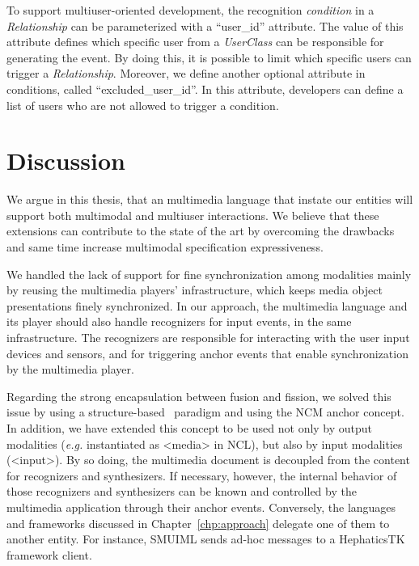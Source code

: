 \documentclass[
  doutorado,
  american
]{ThesisPUC}
\newcommand{\chp}[1]{Chapter~\ref{#1}}
\begin{document}
To support multiuser-oriented development, the recognition \textit{condition} in
a \textit{Relationship} can be parameterized with a “user\_id” attribute. The
value of this attribute defines which specific user from a \textit{UserClass}
can be responsible for generating the event. By doing this, it is possible to
limit which specific users can trigger a \textit{Relationship}. Moreover, we
define another optional attribute in conditions, called “excluded\_user\_id”. In this attribute, developers can define a list of users who are not allowed to
trigger a condition.

\section{Discussion}
\label{sec:approuch:discussion}

We argue in this thesis, that an multimedia language that instate our entities will support both multimodal and multiuser interactions. We believe that these extensions can contribute to the state of the art by overcoming the drawbacks and same time increase multimodal specification expressiveness.

We handled the lack of support for fine synchronization among modalities mainly
by reusing the multimedia players’ infrastructure, which keeps media object
presentations finely synchronized. In our approach, the multimedia language and
its player should also handle recognizers for input events, in the same
infrastructure. The recognizers are responsible for interacting with the user
input devices and sensors, and for triggering anchor events that enable
synchronization by the multimedia player.

Regarding the strong encapsulation between fusion and fission, we solved this
issue by using a structure-based~\cite{bulterman_structured_2005} paradigm and
using the NCM anchor concept. In addition, we have extended this concept to be
used not only by output modalities (\textit{e.g.} instantiated as <media> in NCL), but
also by input modalities (<input>). By so doing, the multimedia document is
decoupled from the content for recognizers and synthesizers. If necessary,
however, the internal behavior of those recognizers and synthesizers can be
known and controlled by the multimedia application through their anchor events.
Conversely, the languages and frameworks discussed in \chp{chp:approach} 
delegate one of
them to another entity. For instance, SMUIML sends ad-hoc messages to a
HephaticsTK framework client. 
\end{document}
